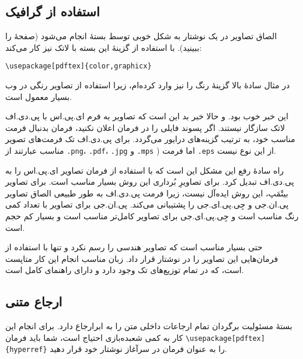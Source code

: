 {\subsection{استفاده از گرافیک}
\label{ssec:pdfgraph}

الصاق تصاویر در یک نوشتار‌ به شکل خوبی توسط بستهٔ  انجام می‌شود 
(صفحهٔ \pageref{eps} را ببینید).
با استفاده از گزینهٔ  
این بسته با لاتک نیز کار می‌کند:

\begin{code}
\begin{verbatim}
\usepackage[pdftex]{color,graphicx}
\end{verbatim}
\end{code}

در مثال سادهٔ بالا گزینهٔ رنگ را نیز وارد کرده‌ام، زیرا استفاده از تصاویر رنگی در وب بسیار معمول است.

این خبر خوب بود. و حالا خبر بد این است که تصاویر به فرم ای.پی.اس با پی.دی.اف لاتک سازگار نیستند. اگر پسوند فایلی را در فرمان  
اعلان نکنید، فرمان   بدنبال فرمت مناسب خود، به ترتیب گزینه‌های درایور می‌گردد. برای پی.دی.اف تک فرمت‌های تصویر مناسب عبارتند از \texttt{.png}، \texttt{.pdf}، \texttt{.jpg} و \texttt{.mps}%
\Footnote{\MP})
 اما فرمت \texttt{.eps} از این نوع نیست.

راه سادهٔ رفع این مشکل این است که با استفاده از فرمان  تصاویر ای.پی.اس را به پی.دی.اف تبدیل کرد. برای تصاویرِ بُرداری 
 این روش بسیار مناسب است. برای تصاویر بیتْمَپ، این روش ایده‌آل نیست،  زیرا فرمت پی.دی.اف به طور طبیعی الصاق تصاویر پی.ان.جی و جِی.پی.ای.جی را پشتیبانی می‌کند. پی.ان.جی برای تصاویر با تعداد  کمی رنگ مناسب است و جِی.پی.ای.جی برای تصاویر کامل‌تر مناسب است و بسیار کم حجم است.
 
حتی بسیار مناسب است که تصاویر هندسی را رسم نکرد و تنها با استفاده از فرمان‌هایی این تصاویر را در نوشتار‌ قرار داد. زبان مناسب انجام این کار 
 متاپست  است، که در تمام توزیع‌های تک وجود دارد و دارای راهنمای کامل است.

\subsection{ارجاع متنی}
\label{ssec:pdfhyperref}

بستهٔ  مسئولیت برگردان تمام ارجاعات داخلی متن را به ابرارجاع دارد. برای انجام این کار به کمی شعبده‌بازی احتیاج است، شما باید فرمان 
\verb+\usepackage[pdftex]{hyperref}+ را به عنوان  
فرمان در سرآغاز نوشتار‌ خود قرار دهید.

}
